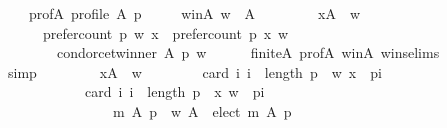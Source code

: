 \begin{isabellebody}
\ \ \ \ prof{\isacharunderscore}{\kern0pt}A{\isacharcolon}{\kern0pt}\ {\isachardoublequoteopen}profile\ A\ p{\isachardoublequoteclose}\ \isanewline
\ \ \ \ w{\isacharunderscore}{\kern0pt}in{\isacharunderscore}{\kern0pt}A{\isacharcolon}{\kern0pt}\ {\isachardoublequoteopen}w\ {\isasymin}\ A{\isachardoublequoteclose}\isanewline
\ \ \isamarkupfalse%
\ \isamarkupfalse%
\isanewline
\ \ \ \ {\isachardoublequoteopen}{\isasymforall}x{\isasymin}A\ {\isacharminus}{\kern0pt}\ {\isacharbraceleft}{\kern0pt}w{\isacharbraceright}{\kern0pt}{\isachardot}{\kern0pt}\isanewline
\ \ \ \ \ \ prefer{\isacharunderscore}{\kern0pt}count\ p\ w\ x\ {\isachargreater}{\kern0pt}\ prefer{\isacharunderscore}{\kern0pt}count\ p\ x\ w\ {\isasymLongrightarrow}\isanewline
\ \ \ \ \ \ \ \ condorcet{\isacharunderscore}{\kern0pt}winner\ A\ p\ w{\isachardoublequoteclose}\isanewline
\ \ \ \ \isamarkupfalse%
\ finite{\isacharunderscore}{\kern0pt}A\ prof{\isacharunderscore}{\kern0pt}A\ w{\isacharunderscore}{\kern0pt}in{\isacharunderscore}{\kern0pt}A\ wins{\isachardot}{\kern0pt}elims\isanewline
\ \ \ \ \isamarkupfalse%
\ simp\isanewline
\ \ \isamarkupfalse%
\ \isamarkupfalse%
\isanewline
\ \ \ \ {\isachardoublequoteopen}{\isasymforall}x{\isasymin}A\ {\isacharminus}{\kern0pt}\ {\isacharbraceleft}{\kern0pt}w{\isacharbraceright}{\kern0pt}{\isachardot}{\kern0pt}\isanewline
\ \ \ \ \ \ \ \ card\ {\isacharbraceleft}{\kern0pt}i{\isachardot}{\kern0pt}\ i\ {\isacharless}{\kern0pt}\ length\ p\ {\isasymand}\ {\isacharparenleft}{\kern0pt}w{\isacharcomma}{\kern0pt}\ x{\isacharparenright}{\kern0pt}\ {\isasymin}\ {\isacharparenleft}{\kern0pt}p{\isacharbang}{\kern0pt}i{\isacharparenright}{\kern0pt}{\isacharbraceright}{\kern0pt}\ {\isacharless}{\kern0pt}\isanewline
\ \ \ \ \ \ \ \ \ \ \ \ card\ {\isacharbraceleft}{\kern0pt}i{\isachardot}{\kern0pt}\ i\ {\isacharless}{\kern0pt}\ length\ p\ {\isasymand}\ {\isacharparenleft}{\kern0pt}x{\isacharcomma}{\kern0pt}\ w{\isacharparenright}{\kern0pt}\ {\isasymin}\ {\isacharparenleft}{\kern0pt}p{\isacharbang}{\kern0pt}i{\isacharparenright}{\kern0pt}{\isacharbraceright}{\kern0pt}\ {\isasymLongrightarrow}\isanewline
\ \ \ \ \ \ \ \ \ \ \ \ \ \ \ \ m\ A\ p\ {\isacharequal}{\kern0pt}\ {\isacharparenleft}{\kern0pt}{\isacharbraceleft}{\kern0pt}w{\isacharbraceright}{\kern0pt}{\isacharcomma}{\kern0pt}\ A\ {\isacharminus}{\kern0pt}\ elect\ m\ A\ p{\isacharcomma}{\kern0pt}\ {\isacharbraceleft}{\kern0pt}{\isacharbraceright}{\kern0pt}{\isacharparenright}{\kern0pt}{\isachardoublequoteclose}\isanewline

\end{isabellebody}

